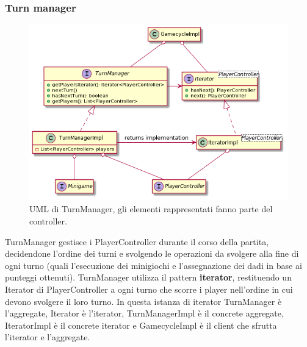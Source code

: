 \documentclass[a4paper,12pt]{report}
\begin{document}
    \subsubsection{Turn manager}
    \begin{figure}[h]
    \centering{}
    \includegraphics[width=\textwidth]{images/freddi/TurnManager.png}
    \caption{UML di TurnManager, gli elementi rappresentati fanno parte del controller.}
    \end{figure}
    TurnManager gestisce i PlayerController durante il corso della partita, decidendone l'ordine dei turni e svolgendo le operazioni da svolgere alla fine di ogni turno (quali l'esecuzione dei minigiochi e l'assegnazione dei dadi in base ai punteggi ottenuti).
    TurnManager utilizza il pattern \textbf{iterator}, restituendo un Iterator di PlayerController a ogni turno che scorre i player nell'ordine in cui devono svolgere il loro turno.
    In questa istanza di iterator TurnManager è l'aggregate, Iterator è l'iterator, TurnManagerImpl è il concrete aggregate, IteratorImpl è il concrete iterator e GamecycleImpl è il client che sfrutta l'iterator e l'aggregate.
\end{document}
